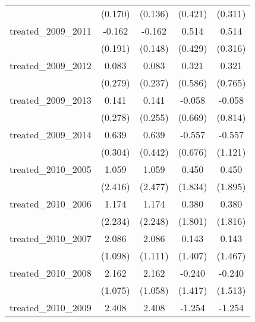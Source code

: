 {\begin{tabular}{l*{4}{c}}
            &     (0.170)         &     (0.136)         &     (0.421)         &     (0.311)         \\
[1em]
treated\_2009\_2011&      -0.162         &      -0.162         &       0.514         &       0.514         \\
            &     (0.191)         &     (0.148)         &     (0.429)         &     (0.316)         \\
[1em]
treated\_2009\_2012&       0.083         &       0.083         &       0.321         &       0.321         \\
            &     (0.279)         &     (0.237)         &     (0.586)         &     (0.765)         \\
[1em]
treated\_2009\_2013&       0.141         &       0.141         &      -0.058         &      -0.058         \\
            &     (0.278)         &     (0.255)         &     (0.669)         &     (0.814)         \\
[1em]
treated\_2009\_2014&       0.639\sym{*}  &       0.639         &      -0.557         &      -0.557         \\
            &     (0.304)         &     (0.442)         &     (0.676)         &     (1.121)         \\
[1em]
treated\_2010\_2005&       1.059         &       1.059         &       0.450         &       0.450         \\
            &     (2.416)         &     (2.477)         &     (1.834)         &     (1.895)         \\
[1em]
treated\_2010\_2006&       1.174         &       1.174         &       0.380         &       0.380         \\
            &     (2.234)         &     (2.248)         &     (1.801)         &     (1.816)         \\
[1em]
treated\_2010\_2007&       2.086         &       2.086         &       0.143         &       0.143         \\
            &     (1.098)         &     (1.111)         &     (1.407)         &     (1.467)         \\
[1em]
treated\_2010\_2008&       2.162\sym{*}  &       2.162\sym{*}  &      -0.240         &      -0.240         \\
            &     (1.075)         &     (1.058)         &     (1.417)         &     (1.513)         \\
[1em]
treated\_2010\_2009&       2.408\sym{***}&       2.408\sym{***}&      -1.254\sym{*}  &      -1.254         \\

\end{tabular}}
